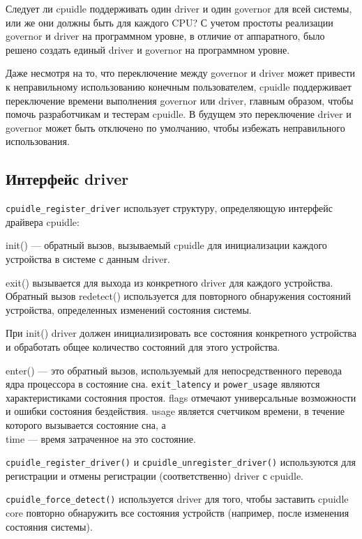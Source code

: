 \documentclass{article}
\begin{document}
Следует ли cpuidle поддерживать один driver и один governor для всей системы, или же они должны быть для каждого CPU? С учетом простоты реализации governor и driver на программном уровне, в отличие от аппаратного, было решено создать единый driver и governor на программном уровне.

Даже несмотря на то, что переключение между governor и driver может привести к неправильному использованию конечным пользователем, cpuidle поддерживает переключение времени выполнения governor или driver, главным образом, чтобы помочь разработчикам и тестерам cpuidle. В будущем это переключение driver и governor может быть отключено по умолчанию, чтобы избежать неправильного использования.

\subsection{Интерфейс driver}
\texttt{cpuidle\_register\_driver} использует структуру, определяющую интерфейс драйвера cpuidle:

init() --- обратный вызов, вызываемый cpuidle для инициализации каждого устройства в системе с данным driver.

exit() вызывается для выхода из конкретного driver для каждого устройства. Обратный вызов redetect() используется для повторного обнаружения состояний устройства, определенных изменений состояния системы.

При init() driver должен инициализировать все состояния конкретного устройства и обработать общее количество состояний для этого устройства.



enter() --- это обратный вызов, используемый для непосредственного перевода ядра процессора в состояние сна. \texttt{exit\_latency} и \texttt{power\_usage} являются характеристиками состояния простоя. flags отмечают универсальные возможности и ошибки состояния бездействия. usage является счетчиком времени, в течение которого вызывается состояние сна, а \\time --- время затраченное на это состояние.

\texttt{cpuidle\_register\_driver()} и \texttt{cpuidle\_unregister\_driver()} используются для регистрации и отмены регистрации (соответственно) driver с cpuidle.

\texttt{cpuidle\_force\_detect()} используется driver для того, чтобы заставить cpuidle core повторно обнаружить все состояния устройств (например, после изменения состояния системы).
\end{document}
